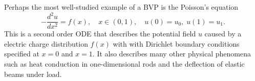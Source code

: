 \begin{example}\label{ex:poisson-bvp}
    Perhaps the most well-studied example of a BVP is the Poisson's 
    equation 
    \begin{equation*}
        - \frac{d^2 u}{dx^2} = f(x), \quad x \in (0,1), 
        \quad u(0) = u_0, \; u(1) = u_1.
    \end{equation*}
    This is a second order ODE that describes the potential field $u$ 
    caused by a electric charge distribution $f(x)$ with 
    with Dirichlet boundary conditions specified at $x=0$ and $x=1$.
    It also describes many other physical phenomena such as 
    heat conduction in one-dimensional rods and the deflection of elastic 
    beams under load.
\end{example}


% 
% 